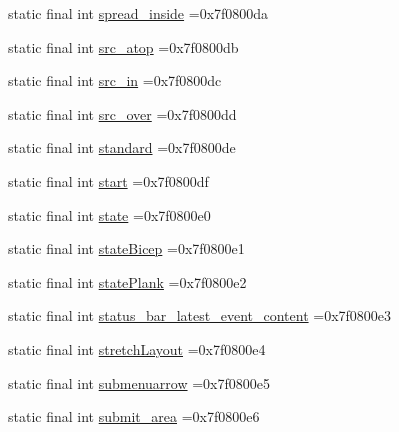 \begin{DoxyCompactItemize}
\item 
static final int \mbox{\hyperlink{classcom_1_1example_1_1trainawearapplication_1_1_r_1_1id_a4e4bf16348c3337d073676cf53f67213}{spread\+\_\+inside}} =0x7f0800da
\item 
static final int \mbox{\hyperlink{classcom_1_1example_1_1trainawearapplication_1_1_r_1_1id_a49b1ea653b90a320082243a3309f5e80}{src\+\_\+atop}} =0x7f0800db
\item 
static final int \mbox{\hyperlink{classcom_1_1example_1_1trainawearapplication_1_1_r_1_1id_acc890227fe3475d4c321bf0b2cd38dce}{src\+\_\+in}} =0x7f0800dc
\item 
static final int \mbox{\hyperlink{classcom_1_1example_1_1trainawearapplication_1_1_r_1_1id_ac67dee0c6f7e8de8186bec4a20acabe8}{src\+\_\+over}} =0x7f0800dd
\item 
static final int \mbox{\hyperlink{classcom_1_1example_1_1trainawearapplication_1_1_r_1_1id_abc6901174f652afed6b06d09c6341367}{standard}} =0x7f0800de
\item 
static final int \mbox{\hyperlink{classcom_1_1example_1_1trainawearapplication_1_1_r_1_1id_acb973a693fc2f894a7955f69945bf77d}{start}} =0x7f0800df
\item 
static final int \mbox{\hyperlink{classcom_1_1example_1_1trainawearapplication_1_1_r_1_1id_a64ca1988077c36e0e866807309e48403}{state}} =0x7f0800e0
\item 
static final int \mbox{\hyperlink{classcom_1_1example_1_1trainawearapplication_1_1_r_1_1id_a41e47d4e38692d8846edadc64f1d7f76}{state\+Bicep}} =0x7f0800e1
\item 
static final int \mbox{\hyperlink{classcom_1_1example_1_1trainawearapplication_1_1_r_1_1id_a681c523be53529954b3eaec9b1a551ef}{state\+Plank}} =0x7f0800e2
\item 
static final int \mbox{\hyperlink{classcom_1_1example_1_1trainawearapplication_1_1_r_1_1id_a918e3cd6364040312d0e03185c6c5ec3}{status\+\_\+bar\+\_\+latest\+\_\+event\+\_\+content}} =0x7f0800e3
\item 
static final int \mbox{\hyperlink{classcom_1_1example_1_1trainawearapplication_1_1_r_1_1id_acd5bbb0b7e7aeb9c4fa5bb396bca3b23}{stretch\+Layout}} =0x7f0800e4
\item 
static final int \mbox{\hyperlink{classcom_1_1example_1_1trainawearapplication_1_1_r_1_1id_af142c96a9a0cbb4e883fda4d170e53b5}{submenuarrow}} =0x7f0800e5
\item 
static final int \mbox{\hyperlink{classcom_1_1example_1_1trainawearapplication_1_1_r_1_1id_ad0af6105080312461c4a423a41433fec}{submit\+\_\+area}} =0x7f0800e6

\end{DoxyCompactItemize}

